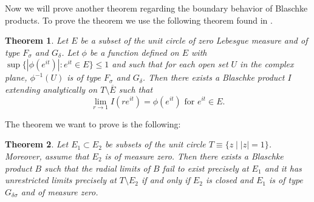 \documentclass[12pt]{article}
\newtheorem{theorem}{Theorem}
\begin{document}
\noindent Now we will prove another theorem regarding the boundary behavior of Blaschke products. To prove the theorem we use the following theorem found in \cite{NI}.

\begin{theorem} Let $E$ be a subset of the unit circle of zero Lebesgue measure and of type $F_\sigma$ and $G_\delta$. Let $\phi$ be a function defined on $E$ with $\sup\lbrace |\phi(e^{it})|:e^{it}\in E\rbrace\leq 1$ and such that for each open set $U$ in the complex plane, $\phi^{-1}(U)$ is of type $F_\sigma$ and $G_\delta$. Then there exists a Blaschke product $I$ extending analytically on $T\setminus \overline{E}$ such that $$\lim_{r\rightarrow 1} I(re^{it})=\phi(e^{it})\text{ for }e^{it}\in E.$$
\end{theorem}

\noindent The theorem we want to prove is the following:
\begin{theorem} Let $E_1\subset E_2$ be subsets of the unit circle $T\equiv\lbrace z\mid |z|=1 \rbrace$. Moreover, assume that $E_2$ is of measure zero. Then there exists a Blaschke product $B$ such that the radial limits of $B$ fail to exist precisely at $E_1$ and it has unrestricted limits precisely at $T\setminus E_2$ if and only if $E_2$ is closed and $E_1$ is of type $G_{\delta\sigma}$ and of measure zero.
\end{theorem}
\end{document}

